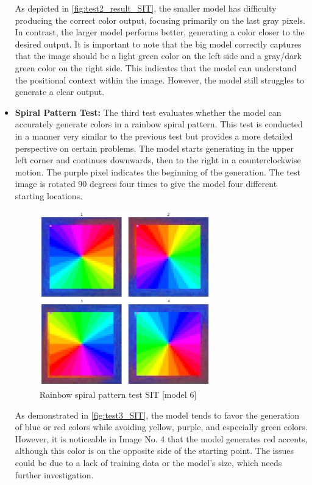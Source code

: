 \begin{itemize}
        As depicted in \autoref{fig:test2_result_SIT}, the smaller model has difficulty producing the correct color output, focusing primarily on the last gray pixels. In contrast, the larger model performs better, generating a color closer to the desired output. It is important to note that the big model correctly captures that the image should be a light green color on the left side and a gray/dark green color on the right side. This indicates that the model can understand the positional context within the image. However, the model still struggles to generate a clear output.
        

        \item \textbf{Spiral Pattern Test:} The third test evaluates whether the model can accurately generate colors in a rainbow spiral pattern. This test is conducted in a manner very similar to the previous test but provides a more detailed perspective on certain problems. The model starts generating in the upper left corner and continues downwards, then to the right in a counterclockwise motion. The purple pixel indicates the beginning of the generation. The test image is rotated 90 degrees four times to give the model four different starting locations.

        \begin{figure}[H]
            \centering
            \includegraphics[width=0.7\textwidth]{imgs/RainbowImageTest_5.0.1.0_big.png}
            \caption{Rainbow spiral pattern test SIT [model 6]}
            \label{fig:test3_SIT}
        \end{figure}
        
        As demonstrated in \autoref{fig:test3_SIT}, the model tends to favor the generation of blue or red colors while avoiding yellow, purple, and especially green colors. However, it is noticeable in Image No. 4 that the model generates red accents, although this color is on the opposite side of the starting point. The issues could be due to a lack of training data or the model's size, which needs further investigation.
        

    \end{itemize}

